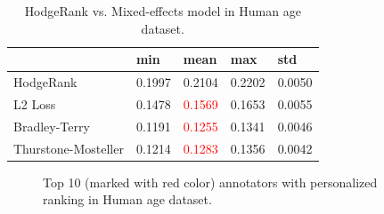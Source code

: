 \documentclass[10pt,journal,cspaper,compsoc]{IEEEtran}
\begin{document}
{\begin{table}[h]\caption{\label{tab:age} HodgeRank vs. Mixed-effects model in Human age dataset.}
\centering
\begin{tabular}{lllll}
 \hline     &min  &mean &max &std\\
 \hline  HodgeRank     &0.1997    &0.2104    &0.2202    &0.0050 \\
\hline  L2 Loss     &0.1478    &\textcolor{red}{0.1569}    &0.1653    &0.0055  \\
\hline Bradley-Terry  &0.1191    &\textcolor{red}{0.1255}    &0.1341    &0.0046 \\
\hline Thurstone-Mosteller    &0.1214    &\textcolor{red}{0.1283}    &0.1356    &0.0042  \\
 \hline
 \end {tabular}
\end{table}




\begin{figure}
 \begin{center}
  \caption{Top 10 (marked with red color) annotators with personalized ranking in Human age dataset.}\label{fig:agepreferencepath}
\end{center}
\end{figure}




}
\end{document}

